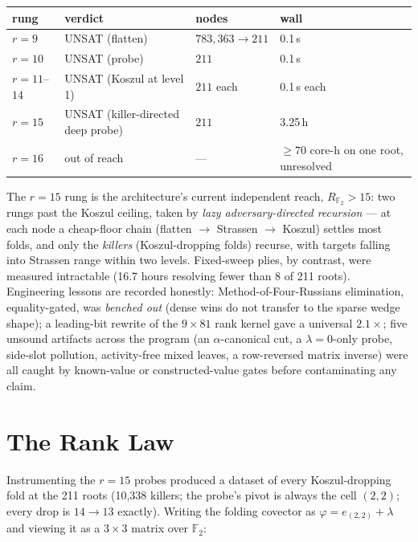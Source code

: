 \documentclass[11pt]{article}
\theoremstyle{definition}
\newcommand{\F}{\mathbb{F}_2}
\begin{document}
\begin{center}
\begin{tabular}{@{}llll@{}}
\toprule
rung & verdict & nodes & wall \\
\midrule
$r=9$ & UNSAT (flatten) & $783{,}363 \to 211$ & 0.1\,s \\
$r=10$ & UNSAT (probe) & $211$ & 0.1\,s \\
$r=11$--$14$ & UNSAT (Koszul at level 1) & $211$ each & 0.1\,s each \\
$r=15$ & UNSAT (killer-directed deep probe) & $211$ & 3.25\,h \\
$r=16$ & out of reach & --- & $\ge 70$ core-h on one root, unresolved \\
\bottomrule
\end{tabular}
\end{center}

The $r=15$ rung is the architecture's current independent reach,
$R_{\F} > 15$: two rungs past the Koszul ceiling, taken by \emph{lazy
adversary-directed recursion} --- at each node a cheap-floor chain
(flatten $\to$ Strassen $\to$ Koszul) settles most folds, and only the
\emph{killers} (Koszul-dropping folds) recurse, with targets falling into
Strassen range within two levels. Fixed-sweep plies, by contrast, were
measured intractable (16.7 hours resolving fewer than 8 of 211 roots).
Engineering lessons are recorded honestly: Method-of-Four-Russians
elimination, equality-gated, was \emph{benched out} (dense wins do not
transfer to the sparse wedge shape); a leading-bit rewrite of the
$9\times 81$ rank kernel gave a universal $2.1\times$; five unsound
artifacts across the program (an $\alpha$-canonical cut, a
$\lambda{=}0$-only probe, side-slot pollution, activity-free mixed
leaves, a row-reversed matrix inverse) were all caught by known-value or
constructed-value gates before contaminating any claim.

\section{The Rank Law}
\label{sec:ranklaw}

Instrumenting the $r=15$ probes produced a dataset of every
Koszul-dropping fold at the 211 roots (10{,}338 killers; the probe's
pivot is always the cell $(2,2)$; every drop is $14 \to 13$ exactly).
Writing the folding covector as $\varphi = e_{(2,2)} + \lambda$ and
viewing it as a $3\times 3$ matrix over $\F$:
\end{document}

